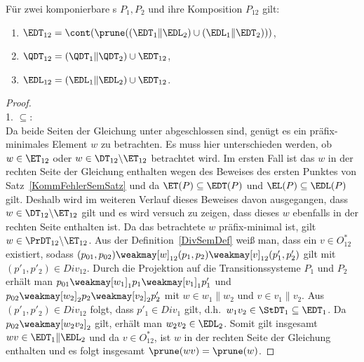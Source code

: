 \begin{Satz}
  \label{DivSemSatz}
  Für zwei komponierbare \MEIO{}s $P_1,P_2$ und ihre Komposition $P_{12}$ gilt:
  \begin{enumerate}
    \item $\EDT _{12} =\cont (\prune ((\EDT _1\|\EDL _2)\cup (\EDL _1\|\EDT
      _2)))$,
    \item $\QDT _{12} =(\QDT _1\|\QDT _2)\cup \EDT _{12}$,
    \item $\EDL _{12} =(\EDL _1\|\EDL _2)\cup \EDT _{12}$.
  \end{enumerate}
\end{Satz}
\begin{proof}\mbox{}\\
  1. \glqq$\subseteq$\grqq{}:\\
  Da beide Seiten der Gleichung unter \cont{} abgeschlossen sind, genügt es ein
  präfix-minimales Element $w$ zu betrachten. Es muss hier unterschieden
  werden, ob $w\in\ET _{12}$ oder $w\in\DT _{12}\backslash\ET _{12}$ betrachtet
  wird. Im ersten Fall ist das $w$ in der rechten Seite der Gleichung enthalten
  wegen des Beweises des ersten Punktes von Satz~\ref{KommFehlerSemSatz} und da
  $\ET (P)\subseteq \EDT (P)$ und $\EL (P)\subseteq \EDL (P)$ gilt. Deshalb
  wird im weiteren Verlauf dieses Beweises davon ausgegangen, dass $w\in\DT
  _{12}\backslash\ET _{12}$ gilt und es wird versuch zu zeigen, dass dieses $w$
  ebenfalls in der rechten Seite enthalten ist. Da das betrachtete $w$
  präfix-minimal ist, gilt $w\in\PrDT _{12}\backslash\ET _{12}$. Aus der
  Definition~\ref{DivSemDef} weiß man, dass ein $v\in O^*_{12}$ existiert,
  sodass $(p_{01},p_{02})\weakmay[w]_{12} (p_1,p_2)\weakmay[v]_{12}
  (p'_1,p'_2)$ gilt mit $(p'_1,p'_2)\in Div _{12}$. Durch die Projektion auf die
  Transitionssysteme $P_1$ und $P_2$ erhält man $p_{01}\weakmay[w_1]_1 p_1
  \weakmay[v_1]_1 p'_1$ und $p_{02}\weakmay[w_2]_2 p_2\weakmay[v_2]_2 p'_2$ mit
  $w\in w_1\|w_2$ und $v\in v_1\|v_2$. Aus $(p'_1,p'_2)\in Div _{12}$ folgt,
  dass \oBdA{} $p'_1\in Div _1$ gilt, d.h.\ $w_1v_2\in\StDT _1\subseteq\EDT
  _1$. Da $p_{02}\weakmay[w_2v_2]_2$ gilt, erhält man $w_2v_2\in\EDL _2$. Somit
  gilt insgesamt $wv\in\EDT _1\|\EDL _2$ und da $v\in O^*_{12}$, ist $w$ in der
  rechten Seite der Gleichung enthalten und es folgt insgesamt $\prune (wv) =
  \prune (w)$.


\end{proof}
